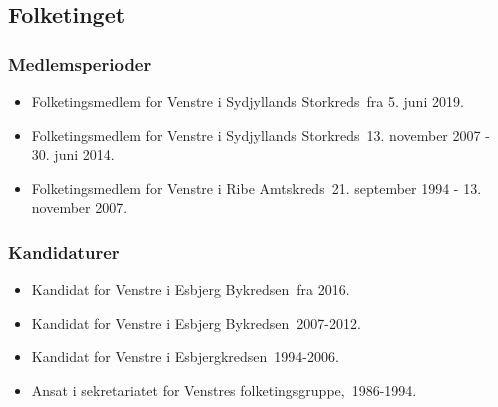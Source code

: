 \documentclass[11pt, a4paper]{awesome-cv}
\begin{document}
\begin{cvletter}
\subsection*{Folketinget}
\subsubsection*{Medlemsperioder}
\begin{itemize}
\item Folketingsmedlem for Venstre i Sydjyllands Storkreds fra 5. juni 2019.
\item Folketingsmedlem for Venstre i Sydjyllands Storkreds 13. november 2007 - 30. juni 2014.
\item Folketingsmedlem for Venstre i Ribe Amtskreds 21. september 1994 - 13. november 2007.
\end{itemize}
\subsubsection*{Kandidaturer}
\begin{itemize}
\item Kandidat for Venstre i Esbjerg Bykredsen fra 2016.
\item Kandidat for Venstre i Esbjerg Bykredsen 2007-2012.
\item Kandidat for Venstre i Esbjergkredsen 1994-2006.
\end{itemize}
\begin{itemize}
\item Ansat i sekretariatet for Venstres folketingsgruppe, 1986-1994.
\end{itemize}
\end{cvletter}
\end{document}

